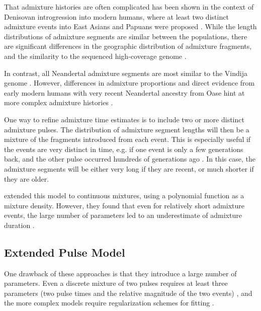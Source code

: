 \documentclass[11pt]{article}
\begin{document}
That admixture histories are often complicated has been shown in the context of Denisovan introgression into modern humans, where at least two distinct admixture events into East Asians and Papuans were proposed \citep{browning_analysis_2018, jacobs_multiple_2019}. While the length distributions of admixture segments are similar between the populations, there are significant differences in the geographic distribution of admixture fragments, and the similarity to the sequenced high-coverage genome \citep{browning_analysis_2018, massilani_denisovan_2020}. 

In contrast, all Neandertal admixture segments are most similar to the Vindija genome \citep{prufer_high-coverage_2017}. However, differences in admixture proportions \citep{meyer_high-coverage_2012, wall_higher_2013,kim_selection_2015,vernot_complex_2015,villanea_multiple_2019} and direct evidence from early modern humans with very recent Neandertal ancestry from Oase hint at more complex admixture histories \citep{fu_early_2015}.


One way to refine admixture time estimates is to include two or more distinct admixture pulses. The distribution of admixture segment lengths will then be a mixture of the fragments introduced from each event. This is especially useful if the events are very distinct in time, e.g. if one event is only a few generations back, and the other pulse occurred hundreds of generations ago \citep{fu_genome_2014, fu_early_2015}. In this case, the admixture segments will be either very long if they are recent, or much shorter if they are older.

\cite{zhou_modeling_2017} extended this model to continuous mixtures, using a polynomial function as a mixture density. However, they found that even for relatively short admixture events, the large number of parameters led to an underestimate of admixture duration \citep{zhou_inference_2017}. 
\subsection{Extended Pulse Model}
One drawback of  these approaches is that they introduce a large number of parameters. Even a discrete mixture of two pulses requires at least three parameters (two pulse times and the relative magnitude of the two events) \citep{pickrell_ancient_2014}, and the more complex models require regularization schemes for fitting \citep{zhou_inference_2017, ralph_geography_2013}.
\end{document}
